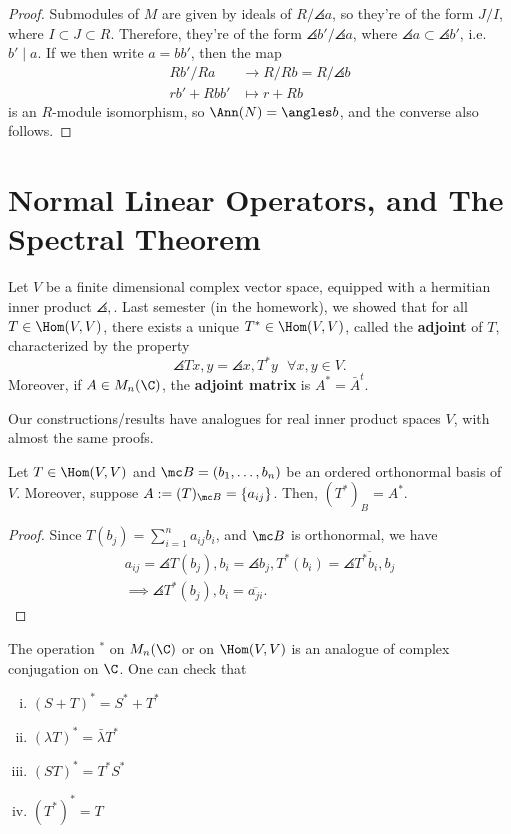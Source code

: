 \begin{proof}
    Submodules of $M$ are given by ideals of $R/\angles a$, so they're of the form $J/I$, where $I \subset J \subset R$. Therefore, they're of the form $\angles{b'}/\angles {a}$, where $\angles a \subset\angles{b'}$, i.e. $b' \mid a$. If we then write $a = bb'$, then the map
    \begin{align*}
        Rb'/Ra &\to R/Rb=R/\angles b
        \\ rb' + Rbb' &\mapsto r+Rb
    \end{align*}
    is an $R$-module isomorphism, so $\Ann (N) = \angles b$, and the converse also follows.
\end{proof}

\section{Normal Linear Operators, and The Spectral Theorem}

Let $V$ be a finite dimensional complex vector space, equipped with a hermitian inner product $\angles ,$. Last semester (in the homework), we showed that for all $T \in \Hom(V,V)$, there exists a unique $T^* \in \Hom(V,V)$, called the \textbf{adjoint} of $T$, characterized by the property
$$\angles{Tx,y}=\angles{x,T^*y}\:\:\: \forall x,y\in V.$$
Moreover, if $A \in M_n(\C)$, the \textbf{adjoint matrix} is $A^* = \bar A^t$.

\begin{rmk}
    Our constructions/results have analogues for real inner product spaces $V$, with almost the same proofs.
\end{rmk}

\begin{lem}
    Let $T \in \Hom(V,V)$ and $\mc B = (b_1,\dots,b_n)$ be an ordered orthonormal basis of $V$. Moreover, suppose $A:= (T)_{\mc B}=\{a_{ij}\}$. Then, $(T^*)_B = A^*$.
\end{lem}

\begin{proof}
    Since $T(b_j) = \sum_{i=1}^na_{ij}b_i$, and $\mc B$ is orthonormal, we have
    \begin{align*}
        a_{ij}=\angles{T(b_j),b_i}=\angles{b_j,T^*(b_i)}=\overline{\angles{T^*b_i,b_j}}
        \\ \implies \angles{T^*(b_j),b_i}=\overline{a_{ji}}.
    \end{align*}
\end{proof}

\begin{rmk}
    The operation $^*$ on $M_n(\C)$ or on $\Hom(V,V)$ is an analogue of complex conjugation on $\C$. One can check that
    \begin{enumerate}[(i)]
        \item $(S+T)^*=S^* + T^*$
        \item $(\lambda T)^* = \bar \lambda T^*$
        \item $(ST)^*=T^*S^*$
        \item $(T^*)^*=T$
    \end{enumerate}
\end{rmk}


